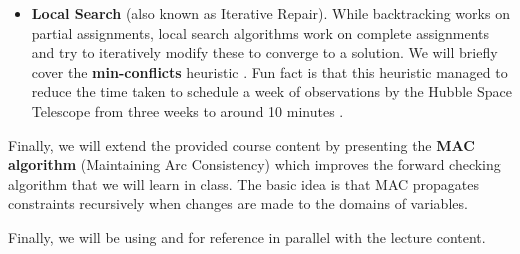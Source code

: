 \begin{itemize}
  \item \textbf{Local Search} (also known as Iterative Repair).
  While backtracking works on partial assignments, local search algorithms work on complete assignments and try to iteratively modify these to converge to a solution.
  We will briefly cover the \textbf{min-conflicts} heuristic \cite{minton1990solving}. Fun fact is that this heuristic managed to reduce the time taken to schedule a week of observations by the Hubble Space Telescope from three weeks to around 10 minutes \cite{russell2016artificial}.
\end{itemize}

Finally, we will extend the provided course content by presenting the \textbf{MAC algorithm} \cite{10.1007/3-540-58601-6_86} (Maintaining Arc Consistency) which improves the forward checking algorithm that we will learn in class.
The basic idea is that MAC propagates constraints recursively when changes are made to the domains of variables.

Finally, we will be using \cite{russell2016artificial} and \cite{dechter2003constraint} for reference in parallel with the lecture content.

